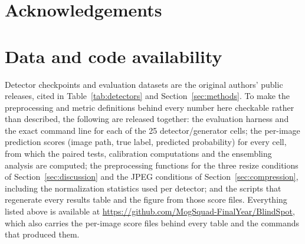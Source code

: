 \documentclass[3p,times,procedia]{elsarticle}
\begin{document}
\section*{Acknowledgements}

\appendix
\section{Data and code availability}
\label{sec:availability}

Detector checkpoints and evaluation datasets are the original authors'
public releases, cited in Table~\ref{tab:detectors} and
Section~\ref{sec:methods}. To make the preprocessing and metric
definitions behind every number here checkable rather than described, the
following are released together: the evaluation harness and the exact
command line for each of the 25 detector/generator cells; the per-image
prediction scores (image path, true label, predicted probability) for
every cell, from which the paired tests, calibration computations and the
ensembling analysis are computed; the preprocessing functions for the three
resize conditions of Section~\ref{sec:discussion} and the JPEG conditions
of Section~\ref{sec:compression}, including the normalization statistics
used per detector; and the scripts that regenerate every results table and
the figure from those score files. Everything listed above is available at
\url{https://github.com/MogSquad-FinalYear/BlindSpot}, which also carries the per-image
score files behind every table and the commands that produced them.
\end{document}
